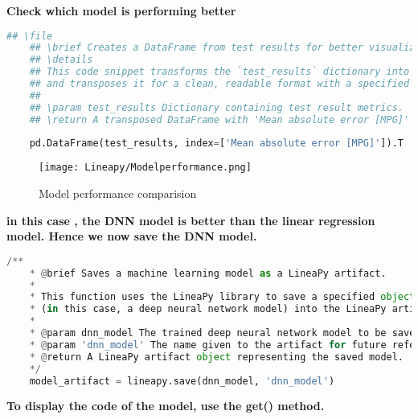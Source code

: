 	\pagebreak
	\textbf{Check which model is performing better }
	
\begin{lstlisting}[language=Python]
	## \file
	## \brief Creates a DataFrame from test results for better visualization.
	## \details 
	## This code snippet transforms the `test_results` dictionary into a pandas DataFrame 
	## and transposes it for a clean, readable format with a specified index.
	##
	## \param test_results Dictionary containing test result metrics.
	## \return A transposed DataFrame with 'Mean absolute error [MPG]' as the index.
	
	pd.DataFrame(test_results, index=['Mean absolute error [MPG]']).T
\end{lstlisting}

	\begin{figure}[h!]
		\centering
		\texttt{[image: Lineapy/Modelperformance.png]}
		\caption{Model performance comparision}
		\label{fig:Model performance comparision}
	\end{figure}
	

	\textbf{in this case , the DNN model is better than the linear regression model. Hence we now save the DNN model.}
	
\begin{lstlisting}[language=Python]
	/**
	* @brief Saves a machine learning model as a LineaPy artifact.
	*
	* This function uses the LineaPy library to save a specified object 
	* (in this case, a deep neural network model) into the LineaPy artifact store.
	*
	* @param dnn_model The trained deep neural network model to be saved.
	* @param 'dnn_model' The name given to the artifact for future reference.
	* @return A LineaPy artifact object representing the saved model.
	*/
	model_artifact = lineapy.save(dnn_model, 'dnn_model')
\end{lstlisting}
	
	\pagebreak
	\textbf{To display the code of the model, use the get() method.}
	
